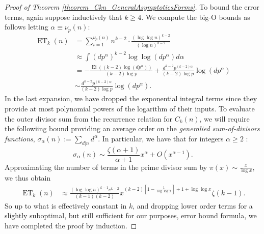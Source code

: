 \documentclass[11pt,reqno,a4letter]{article}
\numberwithin{figure}{section}
\numberwithin{table}{section}
\theoremstyle{plain}
\numberwithin{theorem}{section}
\theoremstyle{definition}
\begin{document}
\begin{proof}[Proof of Theorem \ref{theorem_Ckn_GeneralAsymptoticsForms}]
To bound the error terms, again suppose inductively that $k \geq 4$. We compute the 
big-O bounds as follows letting $\alpha \equiv \nu_p(n)$: 
\begin{align*} 
\operatorname{ET}_k(n) & = 
     \sum_{i=1}^{\nu_p(n)} n^{k-2} \cdot \frac{(\log\log n)^{k-2}}{(\log n)^{k-2}} \\ 
     & \approx 
     \int (dp^{\alpha})^{k-2} \log\log(dp^{\alpha}) d\alpha \\ 
     & = -\frac{\operatorname{Ei}((k-2) \log(dp^{\alpha}))}{(k-2) \log p} + 
     \frac{d^{k-2} p^{(k-2)\alpha}}{(k-2) \log p} \log(dp^{\alpha}) \\ 
     & \sim \frac{d^{k-2} p^{(k-2)\alpha}}{(k-2) \log p} \log(dp^{\alpha}). 
\end{align*} 
In the last expansion, we have dropped the exponential integral terms since they provide at most 
polynomial powers of the logarithm of their inputs. 
To evaluate the outer divisor sum from the recurrence relation for $C_k(n)$, we will require the 
followiing bound providing an average order on the \emph{generalied sum-of-divisors functions}, 
$\sigma_{\alpha}(n) := \sum_{d|n} d^{\alpha}$. In particular, we have that for integers $\alpha \geq 2$ 
\cite[\S 27.11]{NISTHB}: 
\[
\sigma_{\alpha}(n) \sim \frac{\zeta(\alpha+1)}{\alpha+1} x^{\alpha} + O(x^{\alpha-1}). 
\]
Approximating the number of terms in the prime divisor sum by $\pi(x) \sim \frac{x}{\log x}$, 
we thus obtain 
\begin{align*} 
\operatorname{ET}_k(n) & \approx \frac{(\log\log n)^{k-1} e^{k-2}}{(k-1)(k-2)} 
     x^{(k-2)\left[1-\frac{1}{\log\log x}\right]+1+\log\log x} \zeta(k-1). 
\end{align*} 
So up to what is effectively constant in $k$, and dropping lower order terms for a slightly 
suboptimal, but still sufficient for our purposes, error bound formula, 
we have completed the proof by induction. 
\end{proof} 
\end{document}
